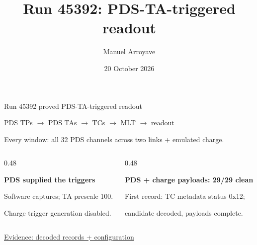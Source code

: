 \documentclass[aspectratio=169,11pt]{beamer}
\title{Run 45392: PDS-TA-triggered readout}
\author{Manuel Arroyave}
\date{20 October 2026}
\begin{document}
\begin{frame}{Run 45392 proved PDS-TA-triggered readout}
  \centering
  {\large PDS TPs $\rightarrow$ PDS TAs $\rightarrow$ TCs $\rightarrow$ MLT $\rightarrow$ readout\par}
  \bigskip
    {Every window: all 32 PDS channels across two links + emulated charge.}
  \bigskip
  \begin{columns}[T,onlytextwidth]
    \begin{column}{0.48\textwidth}
      \raggedright
      \textbf{PDS supplied the triggers}\par
      \smallskip
      \small Software captures; TA prescale 100.\par
      Charge trigger generation disabled.
    \end{column}
    \begin{column}{0.48\textwidth}
      \raggedright
      \textbf{PDS + charge payloads: 29/29 clean}\par
      \smallskip
      \small First record: TC metadata status 0x12;\par
      candidate decoded, payloads complete.
    \end{column}
  \end{columns}
  \bigskip
  {\footnotesize\color{DuneTextMuted}\href{https://github.com/DUNE/PDS/tree/bed0920192126456089d7d44930dbfb145268463/deployments/cern-daphne14/20261020}{Evidence: decoded records + configuration}\par}
\end{frame}
\end{document}
